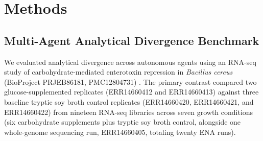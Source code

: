 \documentclass[11pt,letterpaper]{article}
\begin{document}
\section*{Methods}

\subsection*{Multi-Agent Analytical Divergence Benchmark}
We evaluated analytical divergence across autonomous agents using an RNA-seq study of carbohydrate-mediated enterotoxin repression in \textit{Bacillus cereus} (BioProject PRJEB86181, PMC12804731) \cite{vyklicka2026}. The primary contrast compared two glucose-supplemented replicates (ERR14660412 and ERR14660413) against three baseline tryptic soy broth control replicates (ERR14660420, ERR14660421, and ERR14660422) from nineteen RNA-seq libraries across seven growth conditions (six carbohydrate supplements plus tryptic soy broth control, alongside one whole-genome sequencing run, ERR14660405, totaling twenty ENA runs).
\end{document}

